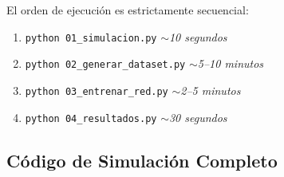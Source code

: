 \documentclass[12pt]{article}
\begin{document}
El orden de ejecuci\'on es estrictamente secuencial:
\begin{enumerate}
\item \texttt{python 01\_simulacion.py} \hfill\textit{$\sim$10 segundos}
\item \texttt{python 02\_generar\_dataset.py} \hfill\textit{$\sim$5--10 minutos}
\item \texttt{python 03\_entrenar\_red.py} \hfill\textit{$\sim$2--5 minutos}
\item \texttt{python 04\_resultados.py} \hfill\textit{$\sim$30 segundos}
\end{enumerate}

\subsection{C\'odigo de Simulaci\'on Completo}
\end{document}
